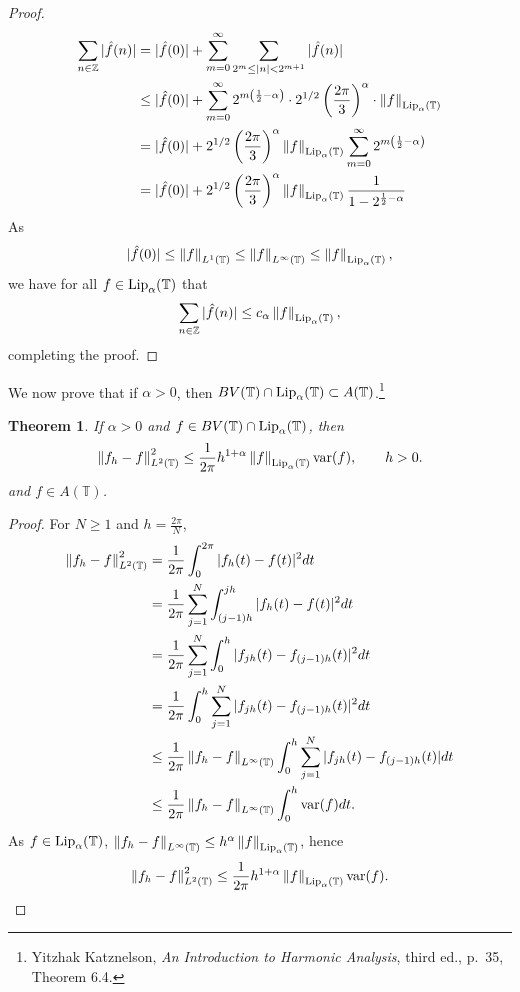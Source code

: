\documentclass{article}
\newcommand{\var}{\ensuremath\mathrm{var}}
\newcommand{\Lip}{\ensuremath\mathrm{Lip}}
\newcommand{\norm}[1]{\left\Vert #1 \right\Vert}
\newtheorem{theorem}{Theorem}
\theoremstyle{definition}
\begin{document}
\begin{proof}
\begin{align*}
\sum_{n \in \mathbb{Z}} |\hat{f}(n)|&=|\hat{f}(0)|+\sum_{m=0}^\infty \sum_{2^m \leq |n| < 2^{m+1}} |\hat{f}(n)|\\
&\leq |\hat{f}(0)|+ \sum_{m=0}^\infty 2^{m\left(\frac{1}{2}-\alpha\right)} \cdot 2^{1/2} \left( \frac{2\pi}{3} \right)^\alpha \cdot  \norm{f}_{\Lip_\alpha(\mathbb{T})}\\
&= |\hat{f}(0)|+2^{1/2} \left( \frac{2\pi}{3} \right)^\alpha   \norm{f}_{\Lip_\alpha(\mathbb{T})} \sum_{m=0}^\infty 2^{m\left(\frac{1}{2}-\alpha\right)}\\
&= |\hat{f}(0)|+2^{1/2} \left( \frac{2\pi}{3} \right)^\alpha   \norm{f}_{\Lip_\alpha(\mathbb{T})} \frac{1}{1-2^{\frac{1}{2}-\alpha}}
\end{align*}
As
\[
|\hat{f}(0)| \leq \norm{f}_{L^1(\mathbb{T})} \leq \norm{f}_{L^\infty(\mathbb{T})} \leq \norm{f}_{\Lip_\alpha(\mathbb{T})},
\]
we have for all $f \in \Lip_\alpha(\mathbb{T})$ that
\[
\sum_{n \in \mathbb{Z}} |\hat{f}(n)| \leq c_\alpha \norm{f}_{\Lip_\alpha(\mathbb{T})},
\]
completing the proof.
\end{proof}

We now prove that if $\alpha>0$, then  $BV(\mathbb{T}) \cap \Lip_\alpha(\mathbb{T}) \subset A(\mathbb{T})$.\footnote{Yitzhak Katznelson, {\em An Introduction to Harmonic Analysis}, third ed., p.~35, Theorem 6.4.}

\begin{theorem}
If $\alpha>0$ and $f \in BV(\mathbb{T}) \cap \Lip_\alpha(\mathbb{T})$, then
\[
\norm{f_h-f}_{L^2(\mathbb{T})}^2 \leq \frac{1}{2\pi} h^{1+\alpha} \norm{f}_{\Lip_\alpha(\mathbb{T})} \var(f), \qquad h > 0.
\]
and $f \in A(\mathbb{T})$.
\end{theorem}
\begin{proof}
For $N \geq 1$ and $h=\frac{2\pi}{N}$,
\begin{align*}
\norm{f_h-f}_{L^2(\mathbb{T})}^2&=\frac{1}{2\pi} \int_0^{2\pi} |f_h(t)-f(t)|^2 dt\\
&=\frac{1}{2\pi} \sum_{j=1}^N \int_{(j-1)h}^{jh} |f_h(t)-f(t)|^2 dt\\
&=\frac{1}{2\pi} \sum_{j=1}^N \int_0^h |f_{jh}(t)-f_{(j-1)h}(t)|^2 dt\\
&=\frac{1}{2\pi} \int_0^h \sum_{j=1}^N |f_{jh}(t)-f_{(j-1)h}(t)|^2 dt\\
&\leq \frac{1}{2\pi} \norm{f_h-f}_{L^\infty(\mathbb{T})} \int_0^h \sum_{j=1}^N |f_{jh}(t)-f_{(j-1)h}(t)| dt\\
&\leq \frac{1}{2\pi}  \norm{f_h-f}_{L^\infty(\mathbb{T})} \int_0^h  \var(f) dt.
\end{align*}
As $f \in \Lip_\alpha(\mathbb{T})$, $\norm{f_h-f}_{L^\infty(\mathbb{T})} \leq h^\alpha \norm{f}_{\Lip_\alpha(\mathbb{T})}$, hence
\[
\norm{f_h-f}_{L^2(\mathbb{T})}^2 \leq \frac{1}{2\pi} h^{1+\alpha} \norm{f}_{\Lip_\alpha(\mathbb{T})} \var(f).
\]
\end{proof}
\end{document}
